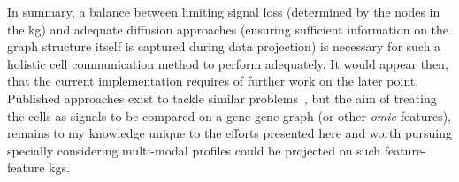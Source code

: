 In summary, a balance between limiting signal loss (determined by the nodes in the \acrshort{kg}) and adequate diffusion approaches (ensuring sufficient information on the graph structure itself is captured during data projection) is necessary for such a holistic cell communication method to perform adequately. It would appear then, that the current implementation requires of further work on the later point. Published approaches exist to tackle similar problems~\cite{lefebvre_large-scale_2021, yang_sctenifoldxct_2023}, but the aim of treating the cells as signals to be compared on a gene-gene graph (or other \emph{omic} features), remains to my knowledge unique to the efforts presented here and worth pursuing specially considering multi-modal profiles could be projected on such feature-feature \acrshort{kg}s. 
